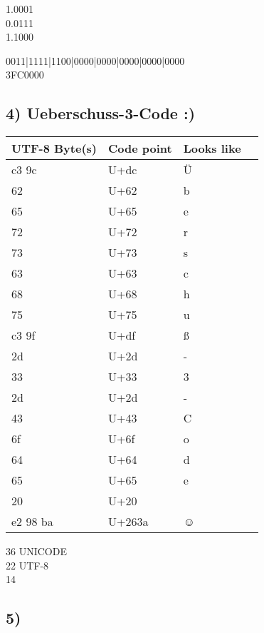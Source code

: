\documentclass[]{article}
\begin{document}
1.0001\\
0.0111\\
1.1000

0011|1111|1100|0000|0000|0000|0000|0000\\
3FC0000

\pagebreak

\subsection{4) Ueberschuss-3-Code :)}\label{ueberschuss-3-code}

\begin{longtable}[l]{@{}llll@{}}
\toprule
UTF-8 Byte(s) & Code point & Looks like\\
\midrule
\endhead
c3 9c & U+dc & Ü\\
62 & U+62 & b\\
65 & U+65 & e\\
72 & U+72 & r\\
73 & U+73 & s\\
63 & U+63 & c\\
68 & U+68 & h\\
75 & U+75 & u\\
c3 9f & U+df & ß\\
2d & U+2d & -\\
33 & U+33 & 3\\
2d & U+2d & -\\
43 & U+43 & C\\
6f & U+6f & o\\
64 & U+64 & d\\
65 & U+65 & e\\
20 & U+20 &\\
e2 98 ba & U+263a & ☺\\
\bottomrule
\end{longtable}

36 UNICODE\\
22 UTF-8\\
14

\subsection{5)}\label{Aufgabe 5}
\end{document}
